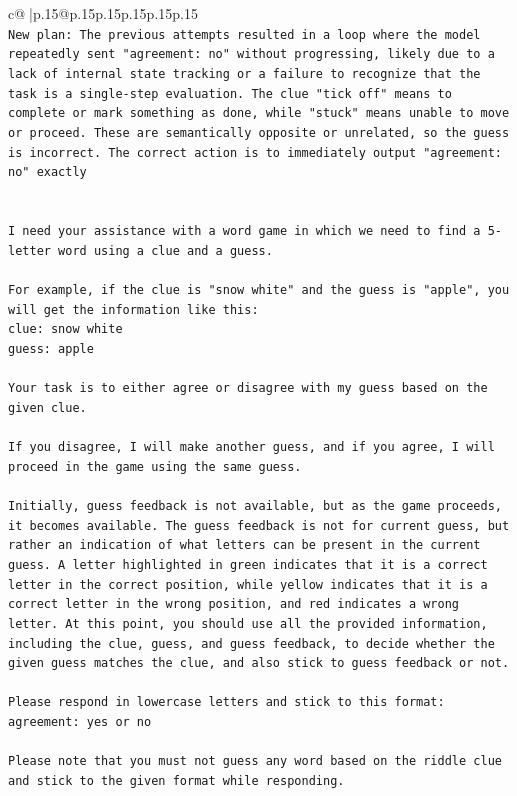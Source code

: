 \documentclass{article}
\begin{document}
{\begin{supertabular}{c@{$\;$}|p{.15\linewidth}@{}p{.15\linewidth}p{.15\linewidth}p{.15\linewidth}p{.15\linewidth}p{.15\linewidth}}
{{{\\ 
\texttt{New plan: The previous attempts resulted in a loop where the model repeatedly sent "agreement: no" without progressing, likely due to a lack of internal state tracking or a failure to recognize that the task is a single{-}step evaluation. The clue "tick off" means to complete or mark something as done, while "stuck" means unable to move or proceed. These are semantically opposite or unrelated, so the guess is incorrect. The correct action is to immediately output "agreement: no" exactly} \\
\\ 
\\ 
\texttt{I need your assistance with a word game in which we need to find a 5{-}letter word using a clue and a guess.} \\
\\ 
\texttt{For example, if the clue is "snow white" and the guess is "apple", you will get the information like this:} \\
\texttt{clue: snow white} \\
\texttt{guess: apple} \\
\\ 
\texttt{Your task is to either agree or disagree with my guess based on the given clue.} \\
\\ 
\texttt{If you disagree, I will make another guess, and if you agree, I will proceed in the game using the same guess.} \\
\\ 
\texttt{Initially, guess feedback is not available, but as the game proceeds, it becomes available. The guess feedback is not for current guess, but rather an indication of what letters can be present in the current guess. A letter highlighted in green indicates that it is a correct letter in the correct position, while yellow indicates that it is a correct letter in the wrong position, and red indicates a wrong letter. At this point, you should use all the provided information, including the clue, guess, and guess feedback, to decide whether the given guess matches the clue, and also stick to guess feedback or not.} \\
\\ 
\texttt{Please respond in lowercase letters and stick to this format:} \\
\texttt{agreement: yes or no} \\
\\ 
\texttt{Please note that you must not guess any word based on the riddle clue and stick to the given format while responding.} \\
}}}
\end{supertabular}}
\end{document}
